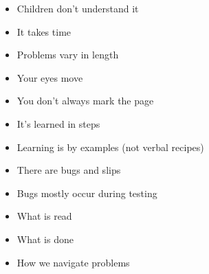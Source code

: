 \begin{slide*}

\bigskip

\begin{itemize}
\item Children don't understand it
\item It takes time
\item Problems vary in length
\item Your eyes move
\item You don't always mark the page
\item It's learned in steps
\item Learning is by examples (not verbal recipes)
\item There are bugs and slips
\item Bugs mostly occur during testing
\end{itemize}

\bigskip
{}\bigskip

\begin{itemize}
\item What is read
\item What is done
\item How we navigate problems
\end{itemize}


\end{slide*}
